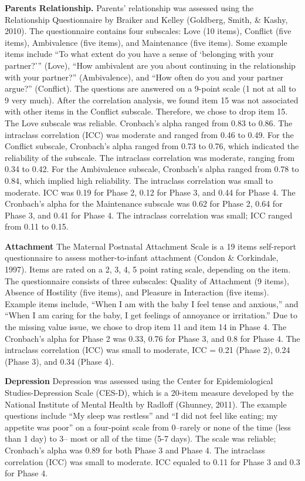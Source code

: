 \documentclass[man]{apa6}
\begin{document}
\textbf{Parents Relationship.}
Parents' relationship was assessed using the Relationship Questionnaire by Braiker and Kelley (Goldberg, Smith, \& Kashy, 2010). The questionnaire contains four subscales: Love (10 items), Conflict (five items), Ambivalence (five items), and Maintenance (five items). Some example items include \enquote{To what extent do you have a sense of \enquote{belonging with your partner?}} (Love), \enquote{How ambivalent are you about continuing in the relationship with your partner?} (Ambivalence), and \enquote{How often do you and your partner argue?} (Conflict). The questions are answered on a 9-point scale (1 not at all to 9 very much). After the correlation analysis, we found item 15 was not associated with other items in the Conflict subscale. Therefore, we chose to drop item 15. The Love subscale was reliable. Cronbach's alpha ranged from 0.83 to 0.86. The intraclass correlation (ICC) was moderate and ranged from 0.46 to 0.49. For the Conflict subscale, Cronbach's alpha ranged from 0.73 to 0.76, which indicated the reliability of the subscale. The intraclass correlation was moderate, ranging from 0.34 to 0.42. For the Ambivalence subscale, Cronbach's alpha ranged from 0.78 to 0.84, which implied high reliability. The intraclass correlation was small to moderate. ICC was 0.19 for Phase 2, 0.12 for Phase 3, and 0.44 for Phase 4. The Cronbach's alpha for the Maintenance subscale was 0.62 for Phase 2, 0.64 for Phase 3, and 0.41 for Phase 4. The intraclass correlation was small; ICC ranged from 0.11 to 0.15.

\textbf{Attachment}
The Maternal Postnatal Attachment Scale is a 19 items self-report questionnaire to assess mother-to-infant attachment (Condon \& Corkindale, 1997). Items are rated on a 2, 3, 4, 5 point rating scale, depending on the item. The questionnaire consists of three subscales: Quality of Attachment (9 items), Absence of Hostility (five items), and Pleasure in Interaction (five items). Example items include, \enquote{When I am with the baby I feel tense and anxious,} and \enquote{When I am caring for the baby, I get feelings of annoyance or irritation.} Due to the missing value issue, we chose to drop item 11 and item 14 in Phase 4. The Cronbach's alpha for Phase 2 was 0.33, 0.76 for Phase 3, and 0.8 for Phase 4. The intraclass correlation (ICC) was small to moderate, ICC = 0.21 (Phase 2), 0.24 (Phase 3), and 0.34 (Phase 4).

\textbf{Depression}
Depression was assessed using the Center for Epidemiological Studies-Depression Scale (CES-D), which is a 20-item measure developed by the National Institute of Mental Health by Radloff (Ghunney, 2011). The example questions include \enquote{My sleep was restless} and \enquote{I did not feel like eating; my appetite was poor} on a four-point scale from 0--rarely or none of the time (less than 1 day) to 3-- most or all of the time (5-7 days). The scale was reliable; Cronbach's alpha was 0.89 for both Phase 3 and Phase 4. The intraclass correlation (ICC) was small to moderate. ICC equaled to 0.11 for Phase 3 and 0.3 for Phase 4.
\end{document}
